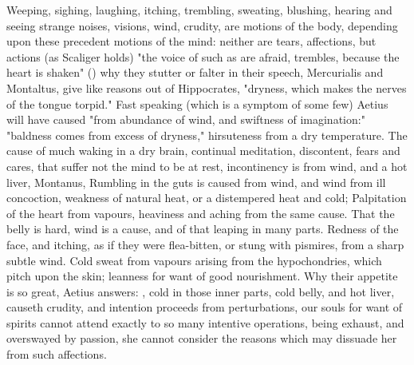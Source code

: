 {Weeping, sighing, laughing, itching, trembling, sweating, blushing, hearing and
seeing strange noises, visions, wind, crudity, are motions of the body,
depending upon these precedent motions of the mind: neither are tears,
affections, but actions (as Scaliger holds) "the voice of
such as are afraid, trembles, because the heart is shaken"
() why they stutter or
falter in their speech, Mercurialis and Montaltus,  give like reasons out of Hippocrates, "dryness,
which makes the nerves of the tongue torpid." Fast speaking (which is a symptom
of some few) Aetius will have caused "from abundance of
wind, and swiftness of imagination:" "baldness comes from
excess of dryness," hirsuteness from a dry temperature. The cause of much
waking in a dry brain, continual meditation, discontent, fears and cares, that
suffer not the mind to be at rest, incontinency is from wind, and a hot liver,
Montanus,  Rumbling in the guts is caused from
wind, and wind from ill concoction, weakness of natural heat, or a distempered
heat and cold; Palpitation of the heart from vapours,
heaviness and aching from the same cause. That the belly is hard, wind is a
cause, and of that leaping in many parts. Redness of the face, and itching, as
if they were flea-bitten, or stung with pismires, from a sharp subtle wind.
Cold sweat from vapours arising from the hypochondries,
which pitch upon the skin; leanness for want of good nourishment. Why their
appetite is so great, Aetius answers: , cold in those inner parts, cold belly, and hot liver, causeth
crudity, and intention proceeds from perturbations, our
souls for want of spirits cannot attend exactly to so many intentive
operations, being exhaust, and overswayed by passion, she cannot consider the
reasons which may dissuade her from such affections.

}

